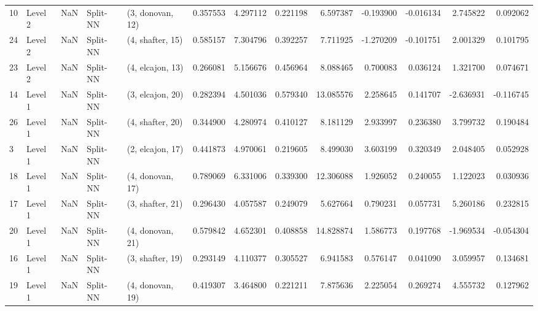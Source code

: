 \begin{tabular}{llrllrrrrrrrr}
10 &   Level 2 &    NaN &       Split-NN &  (3, donovan, 12) &   0.357553 &   4.297112 &  0.221198 &   6.597387 &            -0.193900 &              -0.016134 &            2.745822 &              0.092062 \\
24 &   Level 2 &    NaN &       Split-NN &  (4, shafter, 15) &   0.585157 &   7.304796 &  0.392257 &   7.711925 &            -1.270209 &              -0.101751 &            2.001329 &              0.101795 \\
23 &   Level 2 &    NaN &       Split-NN &  (4, elcajon, 13) &   0.266081 &   5.156676 &  0.456964 &   8.088465 &             0.700083 &               0.036124 &            1.321700 &              0.074671 \\
14 &   Level 1 &    NaN &       Split-NN &  (3, elcajon, 20) &   0.282394 &   4.501036 &  0.579340 &  13.085576 &             2.258645 &               0.141707 &           -2.636931 &             -0.116745 \\
26 &   Level 1 &    NaN &       Split-NN &  (4, shafter, 20) &   0.344900 &   4.280974 &  0.410127 &   8.181129 &             2.933997 &               0.236380 &            3.799732 &              0.190484 \\
3  &   Level 1 &    NaN &       Split-NN &  (2, elcajon, 17) &   0.441873 &   4.970061 &  0.219605 &   8.499030 &             3.603199 &               0.320349 &            2.048405 &              0.052928 \\
18 &   Level 1 &    NaN &       Split-NN &  (4, donovan, 17) &   0.789069 &   6.331006 &  0.339300 &  12.306088 &             1.926052 &               0.240055 &            1.122023 &              0.030936 \\
17 &   Level 1 &    NaN &       Split-NN &  (3, shafter, 21) &   0.296430 &   4.057587 &  0.249079 &   5.627664 &             0.790231 &               0.057731 &            5.260186 &              0.232815 \\
20 &   Level 1 &    NaN &       Split-NN &  (4, donovan, 21) &   0.579842 &   4.652301 &  0.408858 &  14.828874 &             1.586773 &               0.197768 &           -1.969534 &             -0.054304 \\
16 &   Level 1 &    NaN &       Split-NN &  (3, shafter, 19) &   0.293149 &   4.110377 &  0.305527 &   6.941583 &             0.576147 &               0.041090 &            3.059957 &              0.134681 \\
19 &   Level 1 &    NaN &       Split-NN &  (4, donovan, 19) &   0.419307 &   3.464800 &  0.221211 &   7.875636 &             2.225054 &               0.269274 &            4.555732 &              0.127962 \\

\end{tabular}
